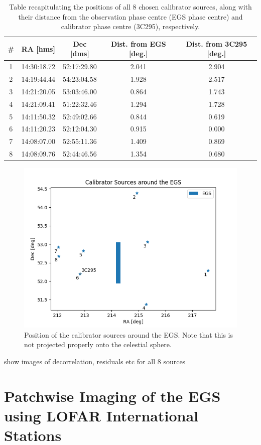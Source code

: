 \begin{table}[h!]
\begin{tabular}{ccccc}
\# & RA [hms]    & Dec [dms]   & Dist. from EGS [deg.] & Dist. from 3C295 [deg.] \\\hline
1  & 14:30:18.72 & 52:17:29.80 & 2.041                         & 2.904 \\
2  & 14:19:44.44 & 54:23:04.58 & 1.928                         & 2.517 \\ 
3  & 14:21:20.05 & 53:03:46.00 & 0.864                         & 1.743 \\
4  & 14:21:09.41 & 51:22:32.46 & 1.294                         & 1.728 \\
5  & 14:11:50.32 & 52:49:02.66 & 0.844                         & 0.619 \\
6  & 14:11:20.23 & 52:12:04.30 & 0.915                         & 0.000 \\
7  & 14:08:07.00 & 52:55:11.36 & 1.409                         & 0.869 \\
8  & 14:08:09.76 & 52:44:46.56 & 1.354                         & 0.680 \\
\end{tabular}
\caption{\label{table.LOBOS.sources}Table recapitulating the positions of all 8 chosen calibrator sources, along with their distance from the observation phase centre (EGS phase centre) and calibrator phase centre (3C295), respectively.}
\end{table}
\begin{figure}[h!]
\includegraphics[width=0.8\linewidth]{images/EGS_LOBOS_scatterplot}
\caption{Position of the calibrator sources around the EGS. Note that this is not projected properly onto the celestial sphere.}
\label{bootes-coverage-image}
\end{figure}

\pg
show images of decorrelation, residuals etc for all 8 sources


\section{Patchwise Imaging of the EGS using LOFAR International Stations}

\newpage